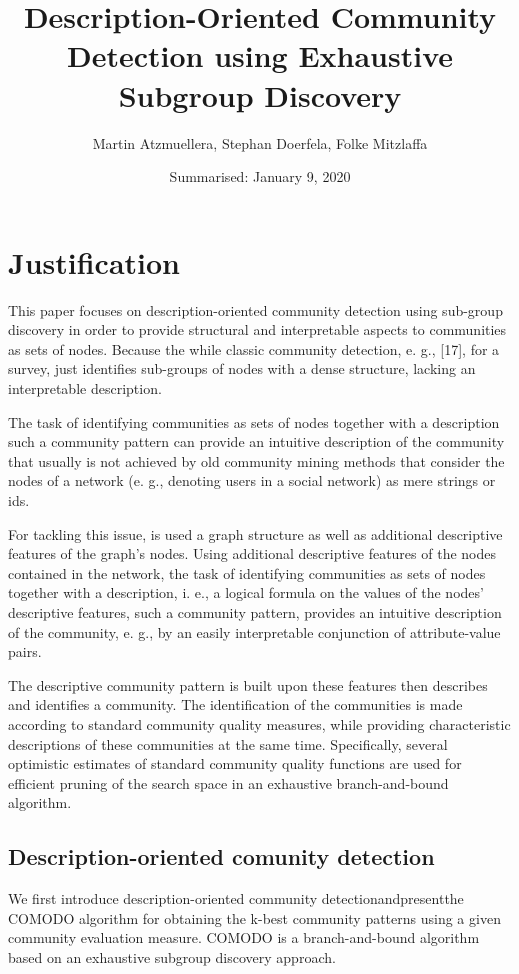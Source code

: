 \documentclass[a4paper]{article}
\title{Description-Oriented Community Detection using Exhaustive Subgroup Discovery}
\date{Summarised: January 9, 2020}
\author{Martin Atzmuellera, Stephan Doerfela, Folke Mitzlaffa}
\begin{document}
\maketitle
\section{Justification}

This paper focuses on description-oriented community detection using sub-group discovery in order to provide structural and interpretable aspects to communities as sets of nodes. Because the while classic community detection, e. g., [17], for a survey, just identifies sub-groups of nodes with a dense structure, lacking an interpretable description. 

The task of identifying communities as sets of nodes together with a description such a community pattern can provide an intuitive description of the community that usually is not achieved by old community mining methods that consider the nodes of a network (e. g., denoting users in a social network) as mere strings or ids.

For tackling this issue, is used a graph structure as well as additional descriptive features of the graph's nodes. Using additional descriptive features of the nodes contained in the network, the task of identifying communities as sets of nodes together with a description, i. e., a logical formula on the values of the nodes' descriptive features, such a community pattern, provides an intuitive description of the community, e. g., by an easily interpretable conjunction of attribute-value pairs. 

The descriptive community pattern is built upon these features then describes and identifies a community. The identification of the communities is made according to standard community quality measures, while providing characteristic descriptions of these communities at the same time. Specifically, several optimistic estimates of standard community quality functions are used for efficient pruning of the search space in an exhaustive branch-and-bound algorithm.

\subsection{Description-oriented comunity detection}
We first introduce description-oriented community detectionandpresentthe COMODO algorithm for obtaining the k-best community patterns using a given community evaluation measure. COMODO is a branch-and-bound algorithm based on an exhaustive subgroup discovery approach.
\end{document}
